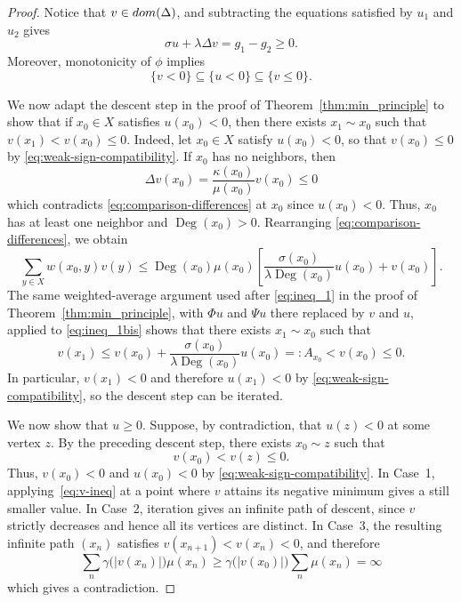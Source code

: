 \documentclass[10pt,a4paper]{amsart}
\newcommand{\Deg}{\operatorname{Deg}}
\newcommand{\dom}{\textnormal{dom}} %
\begin{document}
\begin{proof}
{
Notice that   $v\in\dom(\Delta)$, and subtracting the  equations satisfied by $u_1$ and $u_2$ gives
\begin{equation}
\label{eq:comparison-differences}
 \sigma u+\lambda\Delta v=g_1-g_2\geq0. 
\end{equation}
Moreover, monotonicity of $\phi$ implies
\begin{equation}
\label{eq:weak-sign-compatibility}
 \{v<0\}\subseteq\{u<0\}\subseteq\{v\leq0\}. 
\end{equation}

We now adapt the descent step in the proof of Theorem~\ref{thm:min_principle}
to show
that if $x_0\in X$ satisfies $u(x_0)<0$, then there exists
$x_1\sim x_0$ such that $v(x_1)<v(x_0) \leq 0$.
Indeed, let $x_0\in X$ satisfy
$u(x_0)<0$, so that $v(x_0)\leq0$ by \eqref{eq:weak-sign-compatibility}. If $x_0$ has no neighbors, then
\[
 \Delta v(x_0)=\frac{\kappa(x_0)}{\mu(x_0)}v(x_0)\leq0
\]
which contradicts \eqref{eq:comparison-differences} at $x_0$ since $u(x_0)<0$.
Thus, $x_0$ has at least one neighbor and $\Deg(x_0)>0$. Rearranging
\eqref{eq:comparison-differences}, we obtain
\begin{equation}
\label{eq:ineq_1bis}
 \sum_{y\in X}w(x_0,y)v(y)
 \leq
 \Deg(x_0) \mu(x_0)\left[ \frac{\sigma(x_0)}{\lambda\Deg(x_0)}u(x_0)
 +v(x_0)\right]. 
\end{equation}
The same weighted-average argument used after \eqref{eq:ineq_1} in the
proof of Theorem~\ref{thm:min_principle}, with $\Phi u$ and $\Psi u$
there replaced by $v$ and $u$, applied to \eqref{eq:ineq_1bis} shows that
there exists $x_1\sim x_0$ such that
\begin{equation}
\label{eq:v-ineq}
 v(x_1)
 \leq v(x_0)+\frac{\sigma(x_0)}{\lambda\Deg(x_0)}u(x_0)=:A_{x_0}
 <v(x_0)\leq0. 
\end{equation}
In particular, $v(x_1)<0$ and therefore $u(x_1)<0$ by
\eqref{eq:weak-sign-compatibility}, so the descent step can be
iterated.

We now show that $u \geq 0$. Suppose, by contradiction, that $u(z)<0$ at some vertex $z$. By the preceding
descent step, there exists $x_0\sim z$ such that
\[
v(x_0)<v(z)\leq0.
\]
Thus, $v(x_0)<0$ and $u(x_0)<0$ by
\eqref{eq:weak-sign-compatibility}. In
Case~1, applying~\eqref{eq:v-ineq} at a point where
$v$ attains its negative minimum gives a still smaller value. In
Case~2, iteration gives an infinite path of descent, since $v$ strictly decreases
and hence all its vertices are distinct. In Case~3, the resulting
infinite path $(x_n)$ satisfies $v(x_{n+1})<v(x_n)<0$, and therefore
\[
 \sum_n\gamma\bigl(|v(x_n)|\bigr)\mu(x_n)
 \geq
 \gamma\bigl(|v(x_0)|\bigr)\sum_n\mu(x_n)=\infty
\]
which gives a contradiction.

}
\end{proof}
\end{document}
